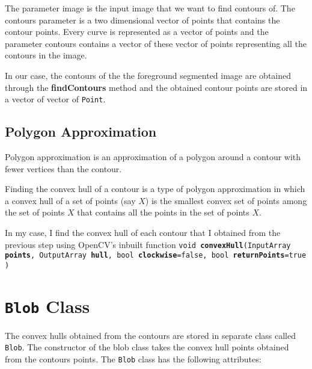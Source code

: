 \documentclass[a4paper]{aitthesis}
\begin{document}
The parameter image is the input image that we want to find contours of. The contours parameter is a two dimensional vector of points that contains the contour points. Every curve is represented as a vector of points and the parameter contours contains a vector of these vector of points representing all the contours in the image.

In our case, the contours of the the foreground segmented image are obtained through the \newline \textbf{findContours} method and the obtained contour points are stored in a vector of vector of \texttt{Point}.

\subsection{Polygon Approximation}
Polygon approximation is an approximation of a polygon around a contour with fewer vertices than the contour. 

Finding the convex hull of a contour is a type of polygon approximation in which a convex hull of a set of points (say $X$) is the smallest convex set of points among the set of points $X$ that contains all the points in the set of points $X$.

In my case, I find the convex hull of each contour that I obtained from the previous step using OpenCV's inbuilt function \texttt{void \textbf{convexHull}(InputArray \textbf{points}, OutputArray \textbf{hull}, bool \textbf{clockwise}=false, bool \textbf{returnPoints}=true )}




\section{\texttt{Blob} Class}
 The convex hulls obtained from the contours are stored in separate class called \texttt{Blob}. The constructor of the blob class takes the convex hull points obtained from the contours points. 
 The \texttt{Blob} class has the following attributes:
 
\end{document}
